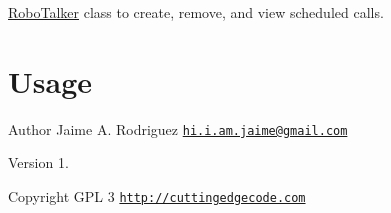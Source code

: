 \hyperlink{class_robo_talker}{Robo\-Talker} class to create, remove, and view scheduled calls.\hypertarget{nav1_usage}{}\section{Usage}\label{nav1_usage}



\begin{DoxyAuthor}{Author}
Jaime A. Rodriguez \href{mailto:hi.i.am.jaime@gmail.com}{\tt hi.\-i.\-am.\-jaime@gmail.\-com} 
\end{DoxyAuthor}
\begin{DoxyVersion}{Version}
1. 
\end{DoxyVersion}
\begin{DoxyCopyright}{Copyright}
G\-P\-L 3 \href{http://cuttingedgecode.com}{\tt http\-://cuttingedgecode.\-com} 
\end{DoxyCopyright}

